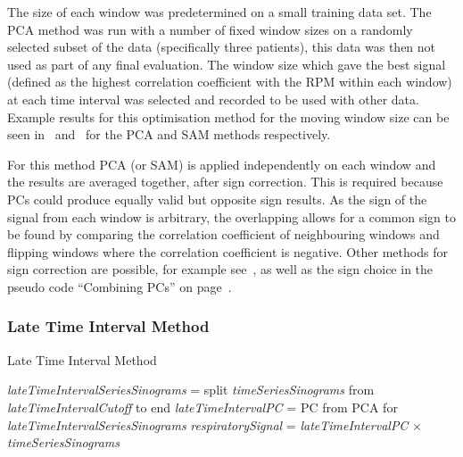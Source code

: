                 The size of each window was predetermined on a small training data set. The PCA method was run with a number of fixed window sizes on a randomly selected subset of the data (specifically three patients), this data was then not used as part of any final evaluation. The window size which gave the best signal (defined as the highest correlation coefficient with the \gls{RPM} within each window) at each time interval was selected and recorded to be used with other data. Example results for this optimisation method for the moving window size can be seen in~ and~ for the \gls{PCA} and \gls{SAM} methods respectively.
                    
                For this method \gls{PCA} (or \gls{SAM}) is applied independently on each window and the results are averaged together, after sign correction. This is required because \glspl{PC} could produce equally valid but opposite sign results. As the sign of the signal from each window is arbitrary,  the overlapping allows for a common sign to be found by comparing the correlation coefficient of neighbouring windows and flipping windows where the correlation coefficient is negative. Other methods for sign correction are possible, for example see~\parencite{Bertolli2017, Feng2018Self-gating:PET}, as well as the sign choice in the pseudo code ``Combining \glspl{PC}'' on page~\pageref{alg:pca_data_driven_surrogate_signal_extraction_methods_for_dynamic_pet_methods_score_select_and_combine_method_combine_combine_pseudo_code}.

            \subsubsection{Late Time Interval Method} \label{sec:pca_data_driven_surrogate_signal_extraction_methods_for_dynamic_pet_methods_late_time_interval_method}
                \begin{algorithm}
                    \caption{Late Time Interval Method}
                    \;
                    \textit{lateTimeIntervalSeriesSinograms} = split \textit{timeSeriesSinograms} from \textit{lateTimeIntervalCutoff} to end\;
                    \textit{lateTimeIntervalPC} = \gls{PC} from \gls{PCA} for \textit{lateTimeIntervalSeriesSinograms}\;
                    \textit{respiratorySignal} = \textit{lateTimeIntervalPC} $\times$ \textit{timeSeriesSinograms}\;
                    \;
        
                    \label{alg:pca_data_driven_surrogate_signal_extraction_methods_for_dynamic_pet_methods_late_time_interval_method_pseudo_code}
                \end{algorithm}
                    
